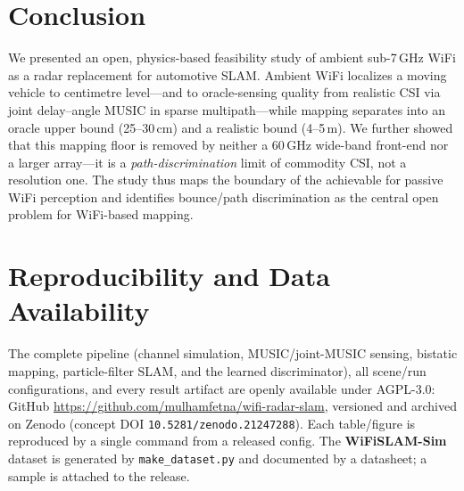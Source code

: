 \documentclass[journal]{IEEEtran}
\newcommand{\SI}[2]{#1\,#2}
\newcommand{\SIrange}[3]{#1--#2\,#3}
\begin{document}
\section{Conclusion}
We presented an open, physics-based feasibility study of ambient sub-\SI{7}{GHz}
WiFi as a radar replacement for automotive SLAM. Ambient WiFi localizes a moving
vehicle to centimetre level---and to oracle-sensing quality from realistic CSI via
joint delay--angle MUSIC in sparse multipath---while mapping separates into an
oracle upper bound (\SIrange{25}{30}{cm}) and a realistic bound
(\SIrange{4}{5}{m}). We further showed that this mapping floor is removed by
neither a \SI{60}{GHz} wide-band front-end nor a larger array---it is a
\emph{path-discrimination} limit of commodity CSI, not a resolution one. The study
thus maps the boundary of the achievable for passive WiFi perception and identifies
bounce/path discrimination as the central open problem for WiFi-based mapping.

\section*{Reproducibility and Data Availability}
The complete pipeline (channel simulation, MUSIC/joint-MUSIC sensing, bistatic
mapping, particle-filter SLAM, and the learned discriminator), all scene/run
configurations, and every result artifact are openly available under AGPL-3.0:
GitHub \url{https://github.com/mulhamfetna/wifi-radar-slam}, versioned and archived
on Zenodo (concept DOI \texttt{10.5281/zenodo.21247288}). Each table/figure is
reproduced by a single command from a released config. The \textbf{WiFiSLAM-Sim}
dataset is generated by \texttt{make\_dataset.py} and documented by a datasheet; a
sample is attached to the release.



\end{document}
